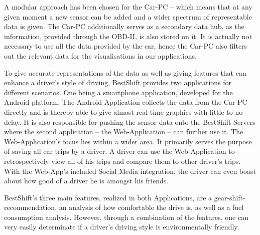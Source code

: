 A modular approach has been chosen for the Car-PC – which means that at any given moment a new sensor can be added and a wider spectrum of representable data is given. The Car-PC additionally serves as a secondary data hub, as the information, provided through the OBD-II, is also stored on it. It is actually not necessary to use all the data provided by the car, hence the Car-PC also filters out the relevant data for the visualisations in our applications.

To give accurate representations of the data as well as giving features that can enhance a driver’s style of driving, BestShift provides two applications for different scenarios. One being a smartphone application, developed for the Android platform. The Android Application collects the data from the Car-PC directly and is thereby able to give almost real-time graphics with little to no delay. It is also responsible for pushing the sensor data onto the BestShift Servers where the second application – the Web-Application – can further use it. The Web-Application’s focus lies within a wider area. It primarily serves the purpose of saving all car trips by a driver. A driver can use the Web-Application to retrospectively view all of his trips and compare them to other driver’s trips. With the Web-App’s included Social Media integration, the driver can even boast about how good of a driver he is amongst his friends.

BestShift’s three main features, realized in both Applications, are a gear-shift-recommendation, an analysis of how comfortable the drive is, as well as a fuel consumption analysis. However, through a combination of the features, one can very easily determinate if a driver’s driving style is environmentally friendly.